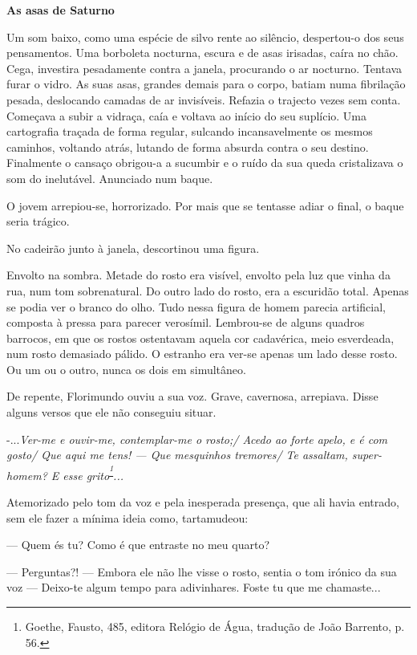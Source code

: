 \vspace*{1.8cm}
\noindent{}\textbf{As asas de Saturno}

\bigskip

Um som baixo, como uma espécie de silvo rente ao silêncio, despertou-o
dos seus pensamentos. Uma borboleta nocturna, escura e de asas irisadas,
caíra no chão. Cega, investira pesadamente contra a janela, procurando o
ar nocturno. Tentava furar o vidro. As suas asas, grandes demais para o
corpo, batiam numa fibrilação pesada, deslocando camadas de ar
invisíveis. Refazia o trajecto vezes sem conta. Começava a subir a
vidraça, caía e voltava ao início do seu suplício. Uma cartografia
traçada de forma regular, sulcando incansavelmente os mesmos caminhos,
voltando atrás, lutando de forma absurda contra o seu destino.
Finalmente o cansaço obrigou-a a sucumbir e o ruído da sua queda
cristalizava o som do inelutável. Anunciado num baque.

O jovem arrepiou-se, horrorizado. Por mais que se tentasse adiar o
final, o baque seria trágico.

No cadeirão junto à janela, descortinou uma figura.

Envolto na sombra. Metade do rosto era visível, envolto pela luz que
vinha da rua, num tom sobrenatural. Do outro lado do rosto, era a
escuridão total. Apenas se podia ver o branco do olho. Tudo nessa figura
de homem parecia artificial, composta à pressa para parecer verosímil.
Lembrou-se de alguns quadros barrocos, em que os rostos ostentavam
aquela cor cadavérica, meio esverdeada, num rosto demasiado pálido. O
estranho era ver-se apenas um lado desse rosto. Ou um ou o outro, nunca
os dois em simultâneo.

De repente, Florimundo ouviu a sua voz. Grave, cavernosa, arrepiava.
Disse alguns versos que ele não conseguiu situar.

-...\emph{Ver-me e ouvir-me, contemplar-me o rosto;/ Acedo ao forte
apelo, e é com gosto/ Que aqui me tens! --- Que mesquinhos tremores/ Te
assaltam, super-homem? E esse grito}\textsuperscript{\emph{\footnote{Goethe,
  Fausto, 485, editora Relógio de Água, tradução de João Barrento, p.
  56. }}}\emph{...}

Atemorizado pelo tom da voz e pela inesperada presença, que ali havia
entrado, sem ele fazer a mínima ideia como, tartamudeou:

--- Quem és tu? Como é que entraste no meu quarto?

--- Perguntas?! --- Embora ele não lhe visse o rosto, sentia o tom irónico
da sua voz --- Deixo-te algum tempo para adivinhares. Foste tu que me
chamaste...

